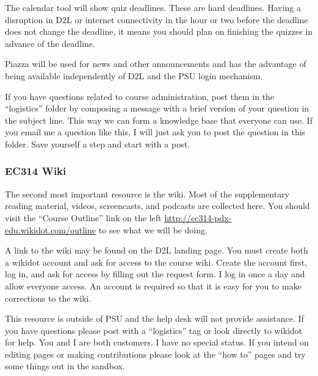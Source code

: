 \documentclass[letterpaper,10pt]{article}
\begin{document}
The calendar tool will show quiz deadlines. These are hard deadlines.  Having a disruption in D2L or internet connectivity in the hour or two before the deadline does not change the deadline, it means you should plan on finishing the quizzes in advance of the deadline.

  


Piazza will be used for news and other announcements and has the advantage of being available independently of D2L and the PSU login mechanism.  

If you have questions related to course administration, post them in
the ``logistics'' folder by composing a message with a brief version of your question in the subject line. This way we can form a knowledge base that everyone can use.  If you email me a question like this, I will just ask you to post the question in this folder.  Save yourself a step and start with a post.


\subsubsection{EC314 Wiki}
The second most important resource is the wiki.  Most of the
supplementary reading material, videos, screencasts, and podcasts are
collected here. You should visit the ``Course Outline'' link on the
left \url{http://ec314-pdx-edu.wikidot.com/outline} to see what we will be
doing.

A link to the wiki may be found on the D2L landing page.  You must create both a wikidot account and ask for access to the course wiki.  Create the account first, log in, and ask for access by filling out the request form.  I log in once a day and allow everyone access.  An account is required so that it is easy for you to make corrections to the wiki.

This resource is outside of PSU and the help desk will not provide
assistance.  If you have questions please post with a  
``logistics'' tag or look directly to wikidot
for help.  You and I are both customers. I have no special status.
If you intend on editing pages or making contributions please look at
the ``how to'' pages and try some things out in the sandbox.
\end{document}
